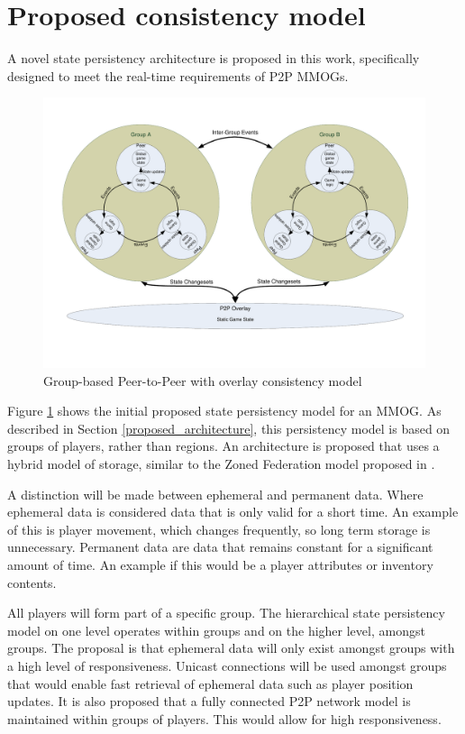 \documentclass[journal,oneside,a4paper,onecolumn]{IEEEtran}
\begin{document}
\section{Proposed consistency model}
\label{proposed_consistency}

A novel state persistency architecture is proposed in this work, specifically designed to meet the real-time requirements of P2P MMOGs.

\begin{figure}[htbp]
 \centering
 \includegraphics[clip=true, viewport= 1cm 3cm 28.5cm 19cm, width=\columnwidth]{group_based_P2P_P2PO}
 \caption{Group-based Peer-to-Peer with overlay consistency model}
 \label{fig_p2p_group_o_cm}
\end{figure}
%
Figure \ref{fig_p2p_group_o_cm} shows the initial proposed state persistency model for an MMOG. As described in Section \ref{proposed_architecture}, this persistency model is based on groups of players, rather than regions. An architecture is proposed that uses a hybrid model of storage, similar to the Zoned Federation model proposed in \cite{zoned_federation}.

A distinction will be made between ephemeral and permanent data. Where ephemeral data is considered data that is only valid for a short time. An example of this is player movement, which changes frequently, so long term storage is unnecessary. Permanent data are data that remains constant for a significant amount of time. An example if this would be a player attributes or inventory contents.

All players will form part of a specific group. The hierarchical state persistency model on one level operates within groups and on the higher level, amongst groups. The proposal is that ephemeral data will only exist amongst groups with a high level of responsiveness. Unicast connections will be used amongst groups that would enable fast retrieval of ephemeral data such as player position updates. It is also proposed that a fully connected P2P network model is maintained within groups of players. This would allow for high responsiveness.
\end{document}
